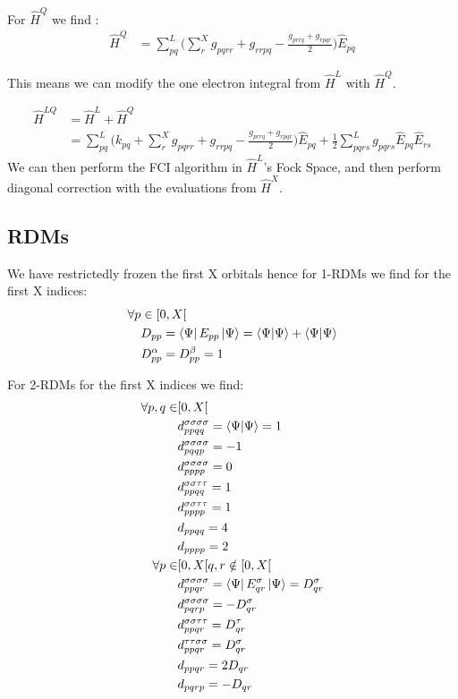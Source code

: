 For $\hat{{H}}^{Q}$ we find :
\begin{align}
   \hat{{H}}^{Q}  &= \sum_{pq}^L \Big(\sum^{X}_r g_{pqrr} + g_{rrpq} - \frac{g_{prrq} + g_{rpqr}}{2}  \Big)  \hat{E}_{pq}
\end{align}

This means we can modify the one electron integral from $\hat{{H}}^{L}$ with $\hat{{H}}^{Q}$.

\begin{align}
   \hat{{H}}^{LQ}  &=  \hat{{H}}^{L} + \hat{{H}}^{Q} \\
                  &=  \sum_{pq}^L \Big(k_{pq} + \sum^{X}_r g_{pqrr} + g_{rrpq} - \frac{g_{prrq} + g_{rpqr}}{2} \Big) \hat{E}_{pq} + \frac{1}{2} \sum_{pqrs}^L g_{pqrs} \hat{E}_{pq} \hat{E}_{rs}
\end{align}
We can then perform the FCI algorithm in $\hat{{H}}^{L}$'s Fock Space, and then perform diagonal correction with the evaluations from $\hat{{H}}^{X}$.

\subsection{RDMs}

We have restrictedly frozen the first X orbitals hence for 1-RDMs we find for the first X indices:
\begin{align}
  \forall p &\in [0,X[ \\
  & D_{pp} = \bra{\Psi} E_{pp} \ket{\Psi} = \braket{\Psi}{\Psi} + \braket{\Psi}{\Psi} \\
  & D_{pp}^\alpha = D_{pp}^\beta = 1
\end{align}

For 2-RDMs for the first X indices we find:
\begin{align}
  \forall p,q \in & [0,X[ \\
  & d^{\sigma \sigma \sigma \sigma}_{ppqq} = \braket{\Psi}{\Psi} = 1 \\
  & d^{\sigma \sigma \sigma \sigma}_{pqqp} = - 1 \\
  & d^{\sigma \sigma \sigma \sigma}_{pppp} = 0 \\
  & d^{\sigma \sigma \tau \tau}_{ppqq} = 1 \\
  & d^{\sigma \sigma \tau \tau}_{pppp} = 1 \\
  & d_{ppqq} = 4 \\
  & d_{pppp} = 2 \\
  \forall p \in & [0, X[ q,r \notin [0, X[ \\
  & d^{\sigma \sigma \sigma \sigma}_{ppqr} = \bra{\Psi} E_{qr}^{\sigma} \ket{\Psi} = D_{qr}^{\sigma} \\
  & d^{\sigma \sigma \sigma \sigma}_{pqrp} = - D_{qr}^{\sigma} \\
  & d^{\sigma \sigma \tau \tau}_{ppqr} = D_{qr}^{\tau} \\
  & d^{\tau \tau \sigma \sigma}_{ppqr} = D_{qr}^{\sigma} \\
  & d_{ppqr} = 2 D_{qr} \\
  & d_{pqrp} = - D_{qr}
\end{align}
